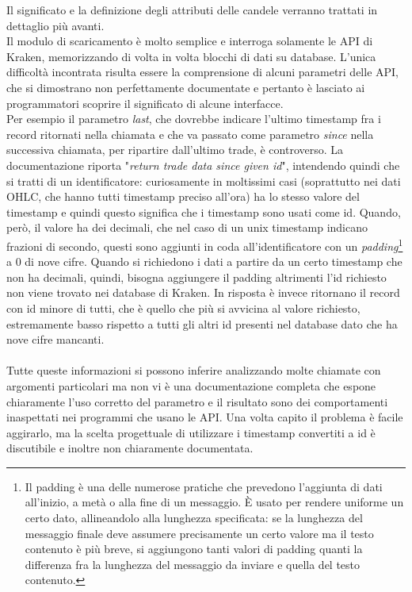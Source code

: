 \documentclass[a4paper,12pt]{report}
\begin{document}
\begin{itemize}
	Il significato e la definizione degli attributi delle candele verranno trattati in dettaglio più avanti.\\
	Il modulo di scaricamento è molto semplice e interroga solamente le API di Kraken, memorizzando di volta in volta blocchi di dati su database. L'unica difficoltà incontrata risulta essere la comprensione di alcuni parametri delle API, che si dimostrano non perfettamente documentate e pertanto è lasciato ai programmatori scoprire il significato di alcune interfacce.\\
	Per esempio il parametro \textit{last}, che dovrebbe indicare l'ultimo timestamp fra i record ritornati nella chiamata e che va passato come parametro \textit{since} nella successiva chiamata, per ripartire dall'ultimo trade, è controverso. La documentazione riporta "\textit{return trade data since given id}", intendendo quindi che si tratti di un identificatore: curiosamente in moltissimi casi (soprattutto nei dati OHLC, che hanno tutti timestamp preciso all'ora) ha lo stesso valore del timestamp e quindi questo significa che i timestamp sono usati come id. Quando, però, il valore ha dei decimali, che nel caso di un unix timestamp indicano frazioni di secondo, questi sono aggiunti in coda all'identificatore con un \textit{padding}\footnote{Il padding è una delle numerose pratiche che prevedono l'aggiunta di dati all'inizio, a metà o alla fine di un messaggio. È usato per rendere uniforme un certo dato, allineandolo alla lunghezza specificata: se la lunghezza del messaggio finale deve assumere precisamente un certo valore ma il testo contenuto è più breve, si aggiungono tanti valori di padding quanti la differenza fra la lunghezza del messaggio da inviare e quella del testo contenuto.} a 0 di nove cifre. Quando si richiedono i dati a partire da un certo timestamp che non ha decimali, quindi, bisogna aggiungere il padding altrimenti l'id richiesto non viene trovato nei database di Kraken. In risposta è invece ritornano il record con id minore di tutti, che è quello che più si avvicina al valore richiesto, estremamente basso rispetto a tutti gli altri id presenti nel database dato che ha nove cifre mancanti.\\~\\
	Tutte queste informazioni si possono inferire analizzando molte chiamate con argomenti particolari ma non vi è una documentazione completa che espone chiaramente l'uso corretto del parametro e il risultato sono dei comportamenti inaspettati nei programmi che usano le API. Una volta capito il problema è facile aggirarlo, ma la scelta progettuale di utilizzare i timestamp convertiti a id è discutibile e inoltre non chiaramente documentata.

	
\end{itemize}
\end{document}
